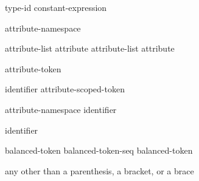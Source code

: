 \begin{bnf}
\br
   \terminal{(} type-id  \terminal{)}\br
   \terminal{(} constant-expression  \terminal{)}
\end{bnf}

\begin{bnf}
\br
   attribute-namespace \terminal{:}
\end{bnf}

\begin{bnf}
\br
  \br
  attribute-list \terminal{,} \br
  attribute \br
  attribute-list \terminal{,} attribute 
\end{bnf}

\begin{bnf}
\br
    attribute-token 
\end{bnf}

\begin{bnf}
\br
    identifier\br
    attribute-scoped-token
\end{bnf}

\begin{bnf}
\br
    attribute-namespace \terminal{::} identifier
\end{bnf}

\begin{bnf}
\br
    identifier
\end{bnf}

\begin{bnf}
\br
    \terminal{(}  \terminal{)}
\end{bnf}

\begin{bnf}
\br
    balanced-token\br
    balanced-token-seq balanced-token
\end{bnf}

\begin{bnf}
\obeyspaces
{}\br
    \terminal{(}  \terminal{)}\br
    \terminal{[}  \terminal{]}\br
    \terminal{\{}  \terminal{\}}\br
    \textnormal{any  other than a parenthesis, a bracket, or a brace}
\end{bnf}

